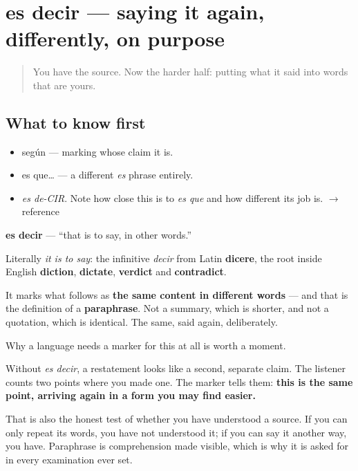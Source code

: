 \section[es decir]{es decir — saying it again, differently, on purpose}

\label{lesson:ES-C277-es-decir}



\begin{quote}
You have the source. Now the harder half: putting what it said into words that are yours.
\end{quote}

\subsection*{What to know first}
\begin{itemize}
\raggedright
  \item según — marking whose claim it is.
  \item es que… — a different \emph{es} phrase entirely.
\end{itemize}

\begin{sounds}
\begin{itemize}
\raggedright
  \item \emph{es de-CIR}. Note how close this is to \emph{es que} and how different its job is. $\to$ reference
\end{itemize}
\end{sounds}

\begin{cousinweb}
\textbf{es decir} — \textquotedblleft{}that is to say, in other words.\textquotedblright{}

Literally \emph{it is to say}: the infinitive \emph{decir} from Latin \textbf{dicere}, the root inside English \textbf{diction}, \textbf{dictate}, \textbf{verdict} and \textbf{contradict}.

It marks what follows as \textbf{the same content in different words} — and that is the definition of a \textbf{paraphrase}. Not a summary, which is shorter, and not a quotation, which is identical. The same, said again, deliberately.
\end{cousinweb}

\begin{grammarlens}[title={What you've built}]
Why a language needs a marker for this at all is worth a moment.

Without \emph{es decir}, a restatement looks like a second, separate claim. The listener counts two points where you made one. The marker tells them: \textbf{this is the same point, arriving again in a form you may find easier.}

That is also the honest test of whether you have understood a source. If you can only repeat its words, you have not understood it; if you can say it another way, you have. Paraphrase is comprehension made visible, which is why it is asked for in every examination ever set.
\end{grammarlens}

